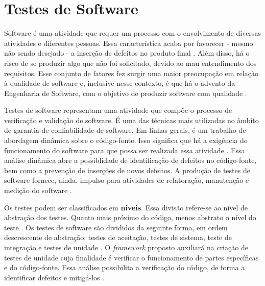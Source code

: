\section{Testes de Software}
Software é uma atividade que requer um processo com o envolvimento de diversas
atividades e diferentes pessoas. Essa característica acaba por favorecer - mesmo
não sendo desejado - a inserção de defeitos no produto final \cite{trodo2009}.
Além disso, há o risco de se produzir algo que não foi solicitado, devido ao
mau entendimento dos requisitos\cite{barbosaEtAl2009}. Esse conjunto de
fatores fez surgir uma maior preocupação em relação à qualidade de software e,
inclusive nesse contexto, é que há o advento da Engenharia de Software, com o
objetivo de produzir software com qualidade \cite{buenoCampelo2013}.

Testes de software representam uma atividade que compõe o processo de
verificação e validação de software. É uma das técnicas mais utilizadas no
âmbito de garantia de confiabilidade de software. Em linhas gerais, é um
trabalho de abordagem dinâmica sobre o código-fonte. Isso significa que há a
exigência do funcionamento do software para que possa ser realizada essa
atividade \cite{barbosaEtAl2009}. Essa análise dinâmica abre a possiblidade de
identificação de defeitos no código-fonte, bem como a prevenção de inserções de
novos defeitos. A produção de testes de software fornece, ainda, impulso para
atividades de refatoração, manutenção e medição do software
\cite{barbosaEtAl2009}.
\par
\indent Os testes podem ser classificados em \textbf{níveis}. Essa divisão
refere-se ao nível de abstração dos testes. Quanto mais próximo do código,
menos abstrato o nível do teste \cite{sommerville2007}. Os testes de software
são divididos da seguinte forma, em ordem descrescente de abstração: testes de aceitação, testes de sistema, teste de integração e testes de unidade \cite{sommerville2007}. O \textit{framework} proposto auxiliará na criação de testes de unidade cuja finalidade é verificar o funcionamento de partes específicas e do código-fonte. Essa análise possibilita a verificação do código, de forma a identificar defeitos e mitigá-los \cite{sommerville2007}.

